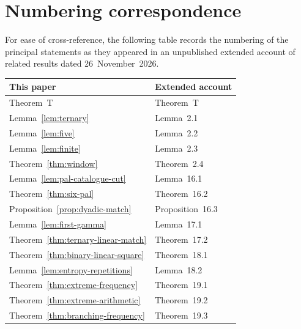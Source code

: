 \documentclass[11pt,reqno,a4paper]{amsart}
\theoremstyle{remark}
\begin{document}
\clearpage
\section*{Numbering correspondence}
For ease of cross-reference, the following table records the numbering of the principal statements as they appeared in an unpublished extended account of related results dated 26~November~2026.
\begin{center}
\begin{tabular}{@{}ll@{}}
\toprule
This paper & Extended account \\
\midrule
Theorem~T & Theorem~T \\
Lemma~\ref{lem:ternary} & Lemma~2.1 \\
Lemma~\ref{lem:five} & Lemma~2.2 \\
Lemma~\ref{lem:finite} & Lemma~2.3 \\
Theorem~\ref{thm:window} & Theorem~2.4 \\
Lemma~\ref{lem:pal-catalogue-cut} & Lemma~16.1 \\
Theorem~\ref{thm:six-pal} & Theorem~16.2 \\
Proposition~\ref{prop:dyadic-match} & Proposition~16.3 \\
Lemma~\ref{lem:first-gamma} & Lemma~17.1 \\
Theorem~\ref{thm:ternary-linear-match} & Theorem~17.2 \\
Theorem~\ref{thm:binary-linear-square} & Theorem~18.1 \\
Lemma~\ref{lem:entropy-repetitions} & Lemma~18.2 \\
Theorem~\ref{thm:extreme-frequency} & Theorem~19.1 \\
Theorem~\ref{thm:extreme-arithmetic} & Theorem~19.2 \\
Theorem~\ref{thm:branching-frequency} & Theorem~19.3 \\
\bottomrule
\end{tabular}
\end{center}
\end{document}
